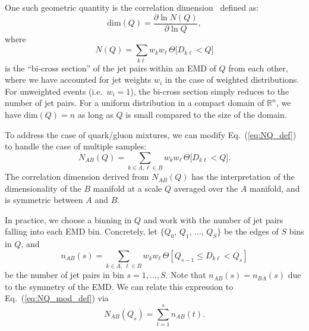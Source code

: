 \documentclass[aps,prd,twocolumn,preprintnumbers,nofootinbib,longbibliography,floatfix]{revtex4-1}
\DeclareRobustCommand{\Eq}[1]{Eq.~(\ref{#1})}
\begin{document}
One such geometric quantity is the correlation dimension~\cite{Grassberger:1983zz,CAMASTRA20032945,NIPS2002_1177967c}  defined as:
%
\begin{equation}
\label{eq:dim_def}
\text{dim}(Q) = \frac{\partial \ln N(Q)}{\partial \ln Q},
\end{equation}
%
where
%
\begin{equation}
\label{eq:NQ_def}
N(Q) = \sum_{k \ell} w_kw_\ell\,\Theta \big[ D_{k \ell} < Q \big]
\end{equation}
%
is the ``bi-cross section'' of the jet pairs within an EMD of $Q$ from each other, where we have accounted for jet weights $w_i$ in the case of weighted distributions.
%
For unweighted events (i.e.~$w_i = 1$), the bi-cross section simply reduces to the number of jet pairs.
%
For a uniform distribution in a compact domain of $\mathbb{R}^n$, we have $\text{dim}(Q) = n$ as long as $Q$ is small compared to the size of the domain.


To address the case of quark/gluon mixtures, we can modify \Eq{eq:NQ_def} to handle the case of multiple samples:
%
\begin{equation}
\label{eq:NQ_mod_def}
N_{AB}(Q) = \sum_{k \in A , \ell \in B}w_kw_\ell \,\Theta \big[ D_{k \ell} < Q \big].
\end{equation}
%
The correlation dimension derived from $N_{AB}(Q)$ has the interpretation of the dimensionality of the $B$ manifold at a scale $Q$ averaged over the $A$ manifold, and is symmetric between $A$ and $B$.



In practice, we choose a binning in $Q$ and work with the number of jet pairs falling into each EMD bin.
%
Concretely, let $\{Q_0,\,Q_1,\,\ldots,\,Q_S\}$ be the edges of $S$ bins in $Q$, and
%
\begin{equation}
\label{eq:ni_def}
n_{AB}(s)=\sum_{k\in A,\,\ell\in B}w_kw_\ell\,\Theta[Q_{s-1}\le D_{k\ell}<Q_s]
\end{equation}
%
be the number of jet pairs in bin $s=1,\ldots,S$.
%
Note that $n_{AB}(s)=n_{BA}(s)$ due to the symmetry of the EMD.
%
We can relate this expression to \Eq{eq:NQ_mod_def} via
%
\begin{equation}
\label{eq:Nn_relation}
N_{AB}(Q_s)=\sum_{t=1}^s n_{AB}(t).
\end{equation}
\end{document}
